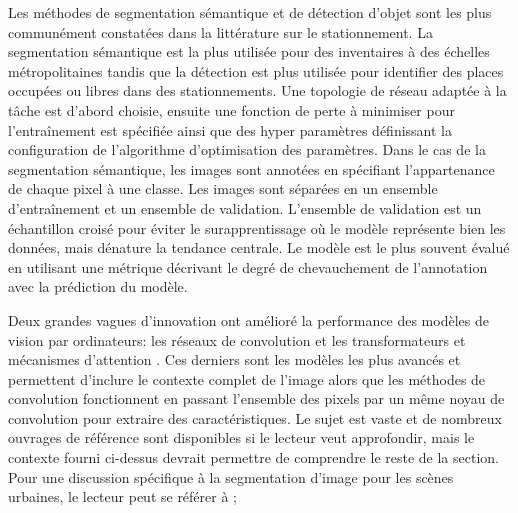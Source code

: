         Les méthodes de segmentation sémantique \parencite{hellekes_parking_2023,qiam_pipeline_2025} et de détection d'objet\parencite{amato_deep_2017,de_almeida_pklot_2015} sont les plus communément constatées dans la littérature sur le stationnement. La segmentation sémantique est la plus utilisée pour des inventaires à des échelles métropolitaines tandis que la détection est plus utilisée pour identifier des places occupées ou libres dans des stationnements.
        Une topologie de réseau adaptée à la tâche est d'abord choisie, ensuite une fonction de perte à minimiser pour l'entraînement est spécifiée ainsi que des hyper paramètres définissant la configuration de l'algorithme d'optimisation des paramètres. Dans le cas de la segmentation sémantique, les images sont annotées en spécifiant l'appartenance de chaque pixel à une classe. Les images sont séparées en un ensemble d'entraînement et un ensemble de validation. L'ensemble de validation est un échantillon croisé pour éviter le surapprentissage où le modèle représente bien les données, mais dénature la tendance centrale\parencite{geman_neural_1992,wallach_deep_2024}. Le modèle est le plus souvent évalué en utilisant une métrique décrivant le degré de chevauchement de l'annotation avec la prédiction du modèle.\par
        Deux grandes vagues d'innovation ont amélioré la performance des modèles de vision par ordinateurs: les réseaux de convolution \parencite{lecun_convolutional_1995,ronneberger_u-net_2015} et les transformateurs et mécanismes d'attention \parencite{lv_deep_2023}. Ces derniers sont les modèles les plus avancés et permettent d'inclure le contexte complet de l'image alors que les méthodes de convolution fonctionnent en passant l'ensemble des pixels par un même noyau de convolution pour extraire des caractéristiques. Le sujet est vaste et de nombreux ouvrages de référence sont disponibles si le lecteur veut approfondir,\parencite{wallach_deep_2024,goodfellow_deep_2016} mais le contexte fourni ci-dessus devrait permettre de comprendre le reste de la section. Pour une discussion spécifique à la segmentation d'image pour les scènes urbaines, le lecteur peut se référer à \textcite{lv_deep_2023}; 

